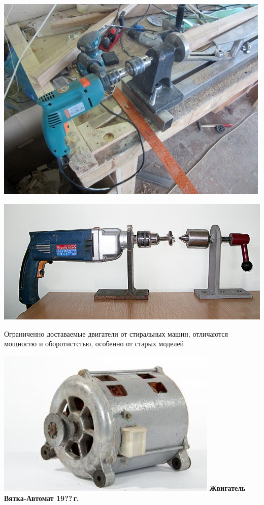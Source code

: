 \documentclass{magazine}
\begin{document}
\begin{multicols}{2}
\noindent\includegraphics[width=\columnwidth]{fig/00/DrelLathe.jpg}

\noindent\includegraphics[width=\columnwidth]{fig/00/DrelLathe2.jpg}

\bigskip
Ограниченно доставаемые двигатели от стиральных машин, отличаются
  мощностю и оборотистстью, особенно от старых моделей
  
\noindent\includegraphics[width=\columnwidth]{fig/00/VyatkaDvig.jpg}
\textbf{Жвигатель Вятка-Автомат 19??\,г.}
  

\end{multicols}
\end{document}
